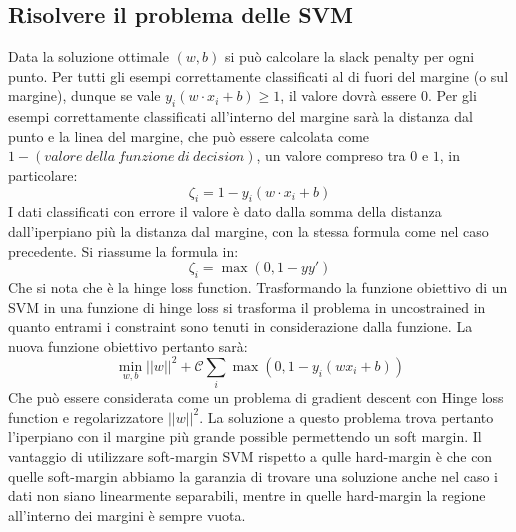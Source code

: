 	\subsection{Risolvere il problema delle SVM}
	Data la soluzione ottimale $(w,b)$ si pu\`o calcolare la slack penalty per ogni punto.
	Per tutti gli esempi correttamente classificati al di fuori del margine (o sul margine), dunque se vale $y_i(w \cdot x_i+b) \ge 1$, il valore dovr\`a essere $0$.
	Per gli esempi correttamente classificati all'interno del margine sar\`a la distanza dal punto e la linea del margine, che pu\`o essere calcolata come $1-(valore\ della\ funzione\ di\ decision)$, un valore compreso tra $0$ e $1$, in particolare:
	$$\zeta_i = 1 - y_i(w \cdot x_i+b)$$
	I dati classificati con errore il valore \`e dato dalla somma della distanza dall'iperpiano pi\`u la distanza dal margine, con la stessa formula come nel caso precedente.
	Si riassume la formula in:
	$$\zeta_i = \max(0,1-yy')$$	
	Che si nota che \`e la hinge loss function.
	Trasformando la funzione obiettivo di un SVM in una funzione di hinge loss si trasforma il problema in uncostrained in quanto entrami i constraint sono tenuti in considerazione dalla funzione.
	La nuova funzione obiettivo pertanto sar\`a:
	$$\min_{w,b}||w||^2+\mathcal{C}\sum_i\max(0,1-y_i(wx_i+b))$$
	Che pu\`o essere considerata come un problema di gradient descent con Hinge loss function e regolarizzatore $||w||^2$.
	La soluzione a questo problema trova pertanto l'iperpiano con il margine pi\`u grande possible permettendo un soft margin. 
	Il vantaggio di utilizzare soft-margin SVM rispetto a qulle hard-margin \`e che con quelle soft-margin abbiamo la garanzia di trovare una soluzione anche nel caso i dati non siano linearmente separabili, mentre in quelle hard-margin la regione all'interno dei margini \`e sempre vuota.

